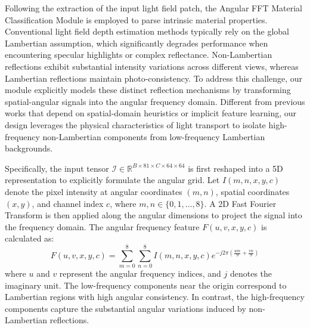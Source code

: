 \documentclass[lettersize,journal]{IEEEtran}
\begin{document}
Following the extraction of the input light field patch, the Angular FFT Material Classification Module is employed to parse intrinsic material properties. Conventional light field depth estimation methods typically rely on the global Lambertian assumption, which significantly degrades performance when encountering specular highlights or complex reflectance. Non-Lambertian reflections exhibit substantial intensity variations across different views, whereas Lambertian reflections maintain photo-consistency. To address this challenge, our module explicitly models these distinct reflection mechanisms by transforming spatial-angular signals into the angular frequency domain. Different from previous works that depend on spatial-domain heuristics or implicit feature learning, our design leverages the physical characteristics of light transport to isolate high-frequency non-Lambertian components from low-frequency Lambertian backgrounds.

Specifically, the input tensor $\mathcal{I} \in \mathbb{R}^{B \times 81 \times C \times 64 \times 64}$ is first reshaped into a 5D representation to explicitly formulate the angular grid. Let $I(m,n,x,y,c)$ denote the pixel intensity at angular coordinates $(m,n)$, spatial coordinates $(x,y)$, and channel index $c$, where $m,n \in \{0, 1, \dots, 8\}$. A 2D Fast Fourier Transform is then applied along the angular dimensions to project the signal into the frequency domain. The angular frequency feature $F(u,v,x,y,c)$ is calculated as:
\begin{equation}
\label{eq:eq3}
F(u,v,x,y,c) = \sum_{m=0}^{8}\sum_{n=0}^{8} I(m,n,x,y,c) e^{-j 2\pi \left(\frac{um}{9} + \frac{vn}{9}\right)}
\end{equation}
where $u$ and $v$ represent the angular frequency indices, and $j$ denotes the imaginary unit. The low-frequency components near the origin correspond to Lambertian regions with high angular consistency. In contrast, the high-frequency components capture the substantial angular variations induced by non-Lambertian reflections. 
\end{document}

